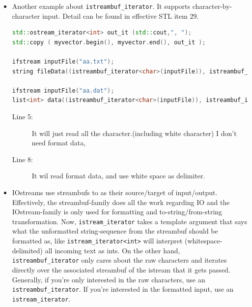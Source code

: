 \documentclass[a4paper,11pt,twoside]{book}
\begin{document}
\begin{itemize}
\begin{lstlisting}[frame=single, language=c++]
vector<Date>::iterator first = 
	find( e.begin(), e.end(), "01/01/95" );

vector<Date>::iterator last = 
	find( e.begin(), e.end(), "12/31/95" );
*last = "12/30/95";
copy( first, last, ostream_iterator<Date>( cout, "\n" ) );
e.insert( --e.end(), TodaysDate() );
\end{lstlisting}


	\item Another example about \texttt{istreambuf\_iterator}. It supports character-by-character input. Detail can be found in effective STL item 29.
\begin{lstlisting}[frame=single, language=c++, basicstyle=\scriptsize]
std::ostream_iterator<int> out_it (std::cout,", ");
std::copy ( myvector.begin(), myvector.end(), out_it );

ifstream inputFile("aa.txt");
string fileData((istreambuf_iterator<char>(inputFile)), istreambuf_iterator<char>());

ifstream inputFile("aa.dat");
list<int> data((istreambuf_iterator<char>(inputFile)), istreambuf_iterator<char>());
\end{lstlisting}
\begin{description}
	\item[Line 5:] It will just read all the character.(including white character) I don't need format data,
	\item[Line 8:] It wil  read format data, and use white space as delimiter.
\end{description}

	\item IOstreams use streambufs to as their source/target of input/output. Effectively, the streambuf-family does all the work regarding IO and the IOstream-family is only used for formatting and to-string/from-string transformation. Now, \texttt{istream\_iterator} takes a template argument that says what the unformatted string-sequence from the streambuf should be formatted as, like \texttt{istream\_iterator<int>} will interpret (whitespace-delimited) all incoming text as ints. On the other hand, \texttt{istreambuf\_iterator} only cares about the raw characters and iterates directly over the associated streambuf of the istream that it gets passed. Generally, if you're only interested in the raw characters, use an \texttt{istreambuf\_iterator}. If you're interested in the formatted input, use an \texttt{istream\_iterator}.

\end{itemize}
\end{document}
